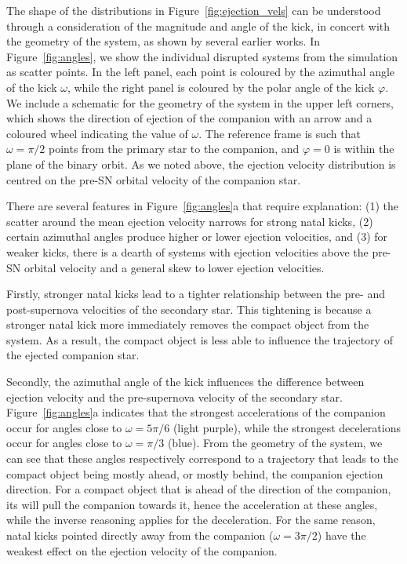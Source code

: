 \documentclass[apj,twocolumn]{openjournal}
\newcommand{\referee}[1]{#1}
\begin{document}
The shape of the distributions in Figure~\ref{fig:ejection_vels} can be understood through a consideration of the magnitude and angle of the kick, in concert with the geometry of the system, as shown by several earlier works. In Figure~\ref{fig:angles}, we show the individual disrupted systems from the \binc simulation as scatter points. In the left panel, each point is coloured by the azimuthal angle of the kick $\omega$, while the right panel is coloured by the polar angle of the kick $\varphi$. We include a schematic for the geometry of the system in the upper left corners, which shows the direction of ejection of the companion with an arrow and a coloured wheel indicating the value of $\omega$. \referee{The reference frame is such that $\omega = \pi / 2$ points from the primary star to the companion, and $\varphi = 0$ is within the plane of the binary orbit}. As we noted above, the ejection velocity distribution is centred on the pre-SN orbital velocity of the companion star.

There are several features in Figure~\ref{fig:angles}a that require explanation: (1) the scatter around the mean ejection velocity narrows for strong natal kicks, (2) certain azimuthal angles produce higher or lower ejection velocities, and (3) for weaker kicks, there is a dearth of systems with ejection velocities above the pre-SN orbital velocity and a general skew to lower ejection velocities.

Firstly, stronger natal kicks lead to a tighter relationship between the pre- and post-supernova velocities of the secondary star. This tightening is because a stronger natal kick more immediately removes the compact object from the system. As a result, the compact object is less able to influence the trajectory of the ejected companion star.

Secondly, the azimuthal angle of the kick influences the difference between ejection velocity and the pre-supernova velocity of the secondary star. Figure~\ref{fig:angles}a indicates that the strongest accelerations of the companion occur for angles close to $\omega = 5\pi/6$ (light purple), while the strongest decelerations occur for angles close to $\omega = \pi/3$ (blue). From the geometry of the system, we can see that these angles respectively correspond to a trajectory that leads to the compact object being mostly ahead, or mostly behind, the companion ejection direction. For a compact object that is ahead of the direction of the companion, its will pull the companion towards it, hence the acceleration at these angles, while the inverse reasoning applies for the deceleration. For the same reason, natal kicks pointed directly away from the companion ($\omega = 3\pi / 2$) have the weakest effect on the ejection velocity of the companion.
\end{document}
